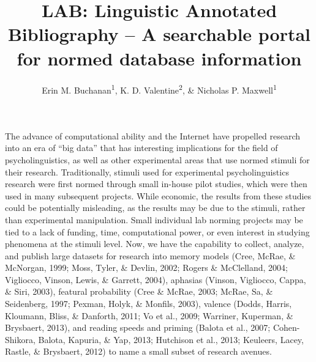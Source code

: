 \documentclass[english,,man]{apa6}
\title{LAB: Linguistic Annotated Bibliography -- A searchable portal for normed
database information}
\author{Erin M. Buchanan\textsuperscript{1}, K. D. Valentine\textsuperscript{2},
\& Nicholas P. Maxwell\textsuperscript{1}}
\date{}
\affiliation{
\vspace{0.5cm}
\textsuperscript{1} Missouri State University\\\textsuperscript{2} University of Missouri}
\theoremstyle{definition}
\theoremstyle{definition}
\theoremstyle{definition}
\theoremstyle{remark}
\begin{document}
\maketitle

The advance of computational ability and the Internet have propelled
research into an era of \enquote{big data} that has interesting
implications for the field of psycholinguistics, as well as other
experimental areas that use normed stimuli for their research.
Traditionally, stimuli used for experimental psycholinguistics research
were first normed through small in-house pilot studies, which were then
used in many subsequent projects. While economic, the results from these
studies could be potentially misleading, as the results may be due to
the stimuli, rather than experimental manipulation. Small individual lab
norming projects may be tied to a lack of funding, time, computational
power, or even interest in studying phenomena at the stimuli level. Now,
we have the capability to collect, analyze, and publish large datasets
for research into memory models (Cree, McRae, \& McNorgan, 1999; Moss,
Tyler, \& Devlin, 2002; Rogers \& McClelland, 2004; Vigliocco, Vinson,
Lewis, \& Garrett, 2004), aphasias (Vinson, Vigliocco, Cappa, \& Siri,
2003), featural probability (Cree \& McRae, 2003; McRae, Sa, \&
Seidenberg, 1997; Pexman, Holyk, \& Monfils, 2003), valence (Dodds,
Harris, Kloumann, Bliss, \& Danforth, 2011; Vo et al., 2009; Warriner,
Kuperman, \& Brysbaert, 2013), and reading speeds and priming (Balota et
al., 2007; Cohen-Shikora, Balota, Kapuria, \& Yap, 2013; Hutchison et
al., 2013; Keuleers, Lacey, Rastle, \& Brysbaert, 2012) to name a small
subset of research avenues.
\end{document}
